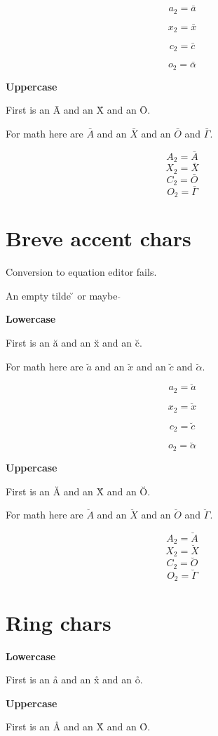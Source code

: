 \documentclass{article}
\begin{document}
$$a_2=\bar{a}$$

$$x_2=\bar{x}$$

$$c_2=\bar{c}$$

$$o_2=\bar{\alpha}$$

\textbf{Uppercase}

First is an \={A} and an \={X} and an \={O}.

For math here are $\bar{A}$ and an $\bar{X}$ and an $\bar{O}$ and $\bar{\Gamma}$.

$$A_2=\bar{A}$$
$$X_2=\bar{X}$$
$$C_2=\bar{O}$$
$$O_2=\bar{\Gamma}$$




\section{Breve accent chars}

Conversion to equation editor fails.

An empty tilde \u{} or maybe $\breve{}$

\textbf{Lowercase}

First is an \u{a} and an \u{x} and an \u{c}.

For math here are $\breve{a}$ and an $\breve{x}$ and an $\breve{c}$ and $\breve{\alpha}$.

$$a_2=\breve{a}$$

$$x_2=\breve{x}$$

$$c_2=\breve{c}$$

$$o_2=\breve{\alpha}$$

\textbf{Uppercase}

First is an \u{A} and an \u{X} and an \u{O}.

For math here are $\breve{A}$ and an $\breve{X}$ and an $\breve{O}$ and $\breve{\Gamma}$.

$$A_2=\breve{A}$$
$$X_2=\breve{X}$$
$$C_2=\breve{O}$$
$$O_2=\breve{\Gamma}$$

\section{Ring chars}
\textbf{Lowercase}

First is an \r{a} and an \r{x} and an \r{o}.

\textbf{Uppercase}

First is an \r{A} and an \r{X} and an \r{O}.


\end{document}

